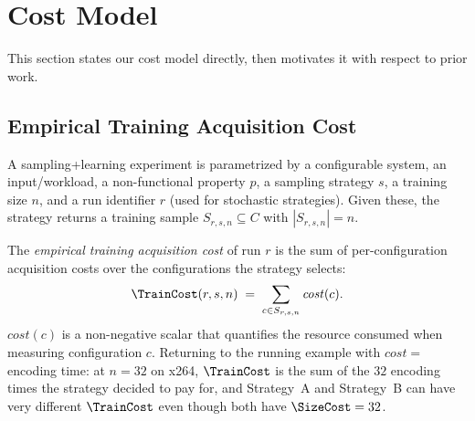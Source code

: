 \section{Cost Model}
\label{sec:cost_model}

This section states our cost model directly, then motivates it with respect
to prior work.

\subsection{Empirical Training Acquisition Cost}
\label{subsec:empirical-cost}

A sampling+learning experiment is parametrized by a configurable system, an
input/workload, a non-functional property $p$, a sampling strategy $s$, a
training size $n$, and a run identifier $r$ (used for stochastic
strategies). Given these, the strategy returns a training sample
$S_{r,s,n}\subseteq C$ with $|S_{r,s,n}|=n$.

The \emph{empirical training acquisition cost} of run $r$ is the sum of
per-configuration acquisition costs over the configurations the strategy
selects:
\begin{equation}
\TrainCost(r,s,n)\;=\;\sum_{c\in S_{r,s,n}} \mathit{cost}(c).
\label{eq:traincost}
\end{equation}
$\mathit{cost}(c)$ is a non-negative scalar that quantifies the resource
consumed when measuring configuration $c$. Returning to the running
example with $\mathit{cost}=$ encoding time: at $n=32$ on x264, $\TrainCost$
is the sum of the $32$ encoding times the strategy decided to pay for, and
Strategy~A and Strategy~B can have very different $\TrainCost$ even though
both have $\SizeCost=32$.

